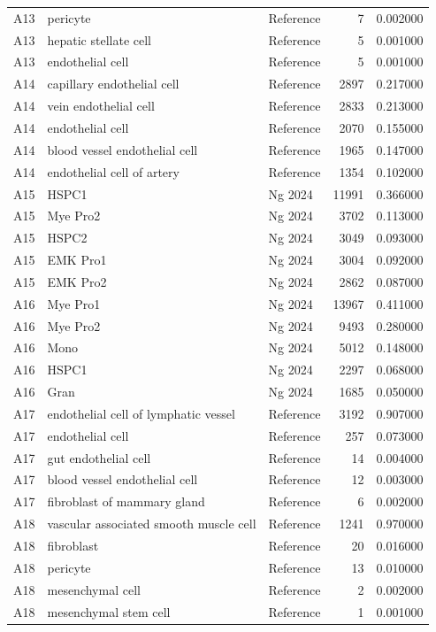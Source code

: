 \begin{longtable}{lllrr}
A13 & pericyte & Reference & 7 & 0.002000 \\
A13 & hepatic stellate cell & Reference & 5 & 0.001000 \\
A13 & endothelial cell & Reference & 5 & 0.001000 \\
A14 & capillary endothelial cell & Reference & 2897 & 0.217000 \\
A14 & vein endothelial cell & Reference & 2833 & 0.213000 \\
A14 & endothelial cell & Reference & 2070 & 0.155000 \\
A14 & blood vessel endothelial cell & Reference & 1965 & 0.147000 \\
A14 & endothelial cell of artery & Reference & 1354 & 0.102000 \\
A15 & HSPC1 & Ng 2024 & 11991 & 0.366000 \\
A15 & Mye Pro2 & Ng 2024 & 3702 & 0.113000 \\
A15 & HSPC2 & Ng 2024 & 3049 & 0.093000 \\
A15 & EMK Pro1 & Ng 2024 & 3004 & 0.092000 \\
A15 & EMK Pro2 & Ng 2024 & 2862 & 0.087000 \\
A16 & Mye Pro1 & Ng 2024 & 13967 & 0.411000 \\
A16 & Mye Pro2 & Ng 2024 & 9493 & 0.280000 \\
A16 & Mono & Ng 2024 & 5012 & 0.148000 \\
A16 & HSPC1 & Ng 2024 & 2297 & 0.068000 \\
A16 & Gran & Ng 2024 & 1685 & 0.050000 \\
A17 & endothelial cell of lymphatic vessel & Reference & 3192 & 0.907000 \\
A17 & endothelial cell & Reference & 257 & 0.073000 \\
A17 & gut endothelial cell & Reference & 14 & 0.004000 \\
A17 & blood vessel endothelial cell & Reference & 12 & 0.003000 \\
A17 & fibroblast of mammary gland & Reference & 6 & 0.002000 \\
A18 & vascular associated smooth muscle cell & Reference & 1241 & 0.970000 \\
A18 & fibroblast & Reference & 20 & 0.016000 \\
A18 & pericyte & Reference & 13 & 0.010000 \\
A18 & mesenchymal cell & Reference & 2 & 0.002000 \\
A18 & mesenchymal stem cell & Reference & 1 & 0.001000 \\

\end{longtable}
